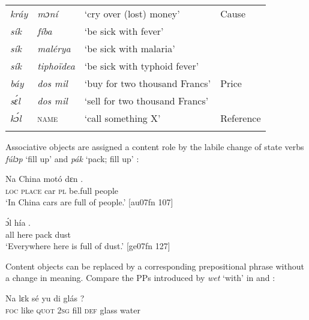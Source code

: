 \begin{table}
\begin{tabularx}{\textwidth}{llll}
\tablevspace
\itshape kráy & \itshape mɔní & ‘cry over (lost) money’ & Cause\\
\itshape sík & \itshape fíba & ‘be sick with fever’ & \\
\itshape sík & \itshape malérya & ‘be sick with malaria’ & \\
\itshape sík & \itshape tiphoïdea & ‘be sick with typhoid fever’ & \\

\tablevspace
\itshape báy & \itshape dos mil & ‘buy for two thousand Francs’ & Price\\
\itshape sɛ́l & \itshape dos mil & ‘sell for two thousand Francs’ & \\

\tablevspace
\itshape kɔ́l & \textsc{name} & ‘call something X’ & Reference\\
\lspbottomrule
\end{tabularx}
\end{table}
Associative objects are assigned a content role\index{} by the labile change of state verbs \textit{fúlɔp} ‘fill up’  and \textit{pák} ‘pack; fill up’ : 


\ea%
    \label{ex:key:1173}
    \gll Na  China  motó  dɛn    .\\
\textsc{loc}  \textsc{place}  car    \textsc{pl}  be.full  people\\

\glt ‘In China cars are full of people.’ [au07fn 107]
\z


\ea%
    \label{ex:key:1174}
    \gll ɔ́l  hía        .\\
all  here    pack  dust\\

\glt ‘Everywhere here is full of dust.’ [ge07fn 127]
\z

Content objects can be replaced by a corresponding prepositional phrase without a change in meaning. Compare the PPs introduced by \textit{wet} ‘with’ in  and :


\ea%
    \label{ex:key:1175}
    \gll Na  lɛk  sé    yu    di  glás    ?\\
\textsc{foc}  like  \textsc{quot}    \textsc{2sg}  fill    \textsc{def}  glass  water\\

